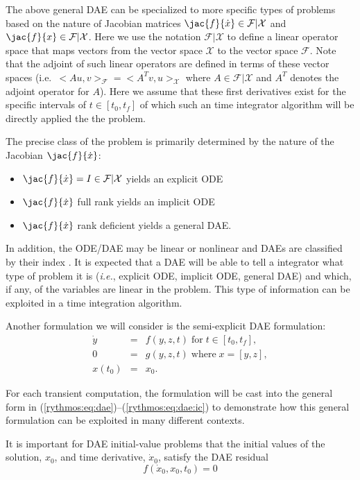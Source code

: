 The above general DAE can be specialized to more specific types of
problems based on the nature of Jacobian matrices $\jac{f}{\dot{x}}\in\mathcal{F}|\mathcal{X}$
and $\jac{f}{x}\in\mathcal{F}|\mathcal{X}$. Here we use the notation
$\mathcal{F}|\mathcal{X}$ to define a linear operator space that
maps vectors from the vector space $\mathcal{X}$ to the vector space
$\mathcal{F}$. Note that the adjoint of such linear operators are
defined in terms of these vector spaces (i.e.\ $<Au,v>_{\mathcal{F}}=<A^{T}v,u>_{\mathcal{X}}$
where $A\in\mathcal{F}|\mathcal{X}$ and $A^{T}$ denotes the adjoint
operator for $A$). Here we assume that these first derivatives exist
for the specific intervals of $t\in[t_{0},t_{f}]$ of which such an
time integrator algorithm will be directly applied the the problem.

The precise class of the problem is primarily determined by the nature
of the Jacobian $\jac{f}{\dot{x}}$: 
\begin{itemize}
\item $\jac{f}{\dot{x}}=I\in\mathcal{F}|\mathcal{X}$ yields an explicit
ODE 
\item $\jac{f}{\dot{x}}$ full rank yields an implicit ODE 
\item $\jac{f}{\dot{x}}$ rank deficient yields a general DAE. 
\end{itemize}
In addition, the ODE/DAE may be linear or nonlinear and DAEs are classified
by their index \cite{BCP}. It is expected that a DAE will be able
to tell a integrator what type of problem it is (\emph{i.e.}, explicit
ODE, implicit ODE, general DAE) and which, if any, of the variables
are linear in the problem. This type of information can be exploited
in a time integration algorithm.

Another formulation we will consider is the semi-explicit DAE formulation:
\begin{equation}
\begin{array}{rcl}
\dot{y} & = & f(y,z,t)\;\mbox{for}\; t\in[t_{0},t_{f}],\\
0 & = & g(y,z,t)\;\mbox{where}\; x=[y,z],\\
x(t_{0}) & = & x_{0}.
\end{array}\label{rythmos:eq:dae:semiexplicit}
\end{equation}


For each transient computation, the formulation will be cast into
the general form in (\ref{rythmos:eq:dae})--(\ref{rythmos:eq:dae:ic})
to demonstrate how this general formulation can be exploited in many
different contexts. 

It is important for DAE initial-value problems that the initial values
of the solution, $x_{0}$, and time derivative, $\dot{x}_{0}$, satisfy
the DAE residual\cite{Brown1998}
\[
f(\dot{x}_{0},x_{0},t_{0})=0
\]

